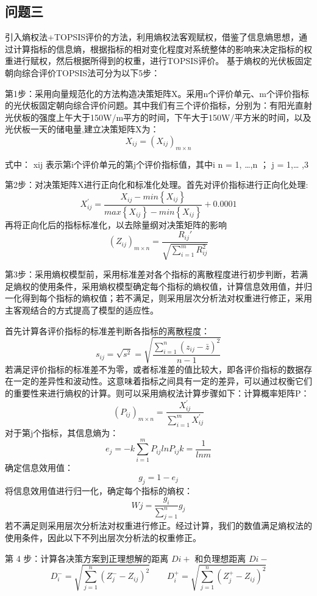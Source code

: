 \documentclass[withoutpreface,bwprint]{cumcmthesis} %
\begin{document}
\subsection{问题三}


引入熵权法+TOPSIS评价的方法，利用熵权法客观赋权，借鉴了信息熵思想，通过计算指标的信息熵，根据指标的相对变化程度对系统整体的影响来决定指标的权重进行赋权，然后根据所得到的权重，进行TOPSIS评价。
基于熵权的光伏板固定朝向综合评价TOPSIS法可分为以下5步：



第1步：采用向量规范化的方法构造决策矩阵X。采用n个评价单元、m个评价指标的光伏板固定朝向综合评价问题。其中我们有三个评价指标，分别为：有阳光直射光伏板的强度上午大于150W/m平方的时间，下午大于150W/平方米的时间，以及光伏板一天的储电量,建立决策矩阵X为：
$$
X_{ij}=\left ( X_{ij} \right )_{m\times n}
$$

式中： xij 表示第i个评价单元的第j个评价指标值，其中i n = 1, …,n  ； j = 1,… ,3

第2步：对决策矩阵X进行正向化和标准化处理。首先对评价指标进行正向化处理:
$$
X_{ij}^{'}=\frac{X_{ij}^{}-min\left \{ X_{ij} \right \}}{max\left \{ X_{ij} \right \}-min\left \{ X_{ij} \right \}}+0.0001
$$
再将正向化后的指标标准化，以去除量纲对决策矩阵的影响
$$
(Z_{ij})_{m\times n}=\frac{R_{ij}'}{\sqrt{\sum_{i=1}^{m}R_{ij}^{2}}}
$$

第3步：采用熵权模型前，采用标准差对各个指标的离散程度进行初步判断，若满足熵权的使用条件，采用熵权模型确定每个指标的熵权值，计算信息效用值，并归一化得到每个指标的熵权值；若不满足，则采用层次分析法对权重进行修正，采用主客观结合的方式提高了模型的适应性。

首先计算各评价指标的标准差判断各指标的离散程度：
$$
s_{ij} = \sqrt{ s^2 } = \sqrt{ \frac{\sum_{i=1}^{n}(z_{ij}-\bar{z})^2}{n-1}}
$$
若满足评价指标的标准差不为零，或者标准差的值比较大，即各评价指标的数据存在一定的差异性和波动性。这意味着指标之间具有一定的差异，可以通过权衡它们的重要性来进行熵权的计算。则可以采用熵权法计算步骤如下：计算概率矩阵P：
$$
\left ( P_{ij} \right )_{m\times n}=\frac{X_{ij}^{'}}{\sum_{i=1}^{m}X_{ij}^{'}}
$$
对于第j个指标，其信息熵为：
$$
e_{j}=-k\sum_{i=1}^{m}P_{ij}lnP_{ij}       k=\frac{1}{lnm}
$$
确定信息效用值：
$$
g_{j}=1-e_{j}
$$
将信息效用值进行归一化，确定每个指标的熵权：
$$
W{j}=\frac{g_{i}}{\sum_{j=1}^{n}}g_{j}
$$
若不满足则采用层次分析法对权重进行修正。经过计算，我们的数值满足熵权法的使用条件，因此以下不列出层次分析法的权重修正。


第 4 步：计算各决策方案到正理想解的距离 $Di+$ 和负理想距离 $Di-$
$$
D_{i}^{-}=\sqrt{\sum_{j=1}^{n}(Z_{j}^{-}-Z_{ij})^2} \qquad D_{i}^{+}=\sqrt{\sum_{j=1}^{n}(Z_{j}^{+}-Z_{ij})^2}
$$
\end{document}

